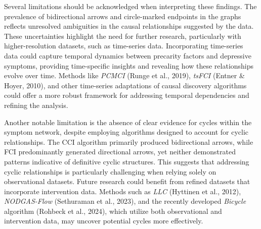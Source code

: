 \documentclass[
]{article}
\begin{document}
Several limitations should be acknowledged when interpreting these
findings. The prevalence of bidirectional arrows and circle-marked
endpoints in the graphs reflects unresolved ambiguities in the causal
relationships suggested by the data. These uncertainties highlight the
need for further research, particularly with higher-resolution datasets,
such as time-series data. Incorporating time-series data could capture
temporal dynamics between precarity factors and depressive symptoms,
providing time-specific insights and revealing how these relationships
evolve over time. Methods like \emph{PCMCI} (Runge et al., 2019),
\emph{tsFCI} (Entner \& Hoyer, 2010), and other time-series adaptations
of causal discovery algorithms could offer a more robust framework for
addressing temporal dependencies and refining the analysis.

Another notable limitation is the absence of clear evidence for cycles
within the symptom network, despite employing algorithms designed to
account for cyclic relationships. The CCI algorithm primarily produced
bidirectional arrows, while FCI predominantly generated directional
arrows, yet neither demonstrated patterns indicative of definitive
cyclic structures. This suggests that addressing cyclic relationships is
particularly challenging when relying solely on observational datasets.
Future research could benefit from refined datasets that incorporate
intervention data. Methods such as \emph{LLC} (Hyttinen et al., 2012),
\emph{NODGAS-Flow }(Sethuraman et al., 2023), and the recently developed
\emph{Bicycle} algorithm (Rohbeck et al., 2024), which utilize both
observational and intervention data, may uncover potential cycles more
effectively.
\end{document}

